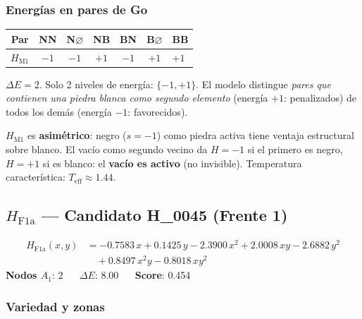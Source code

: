 \documentclass[11pt,a4paper]{article}
\newcommand{\dE}{\Delta E}
\begin{document}
\subsubsection*{Energías en pares de Go}

\begin{center}
\begin{tabular}{cccccc}
  \toprule
  Par & NN & N$\varnothing$ & NB & BN & B$\varnothing$ & BB \\
  \midrule
  $H_{\text{M1}}$ & $-1$ & $-1$ & $+1$ & $-1$ & $+1$ & $+1$ \\
  \bottomrule
\end{tabular}
\end{center}

$\dE=2$. Solo 2 niveles de energía: $\{-1, +1\}$.
El modelo distingue \emph{pares que contienen una piedra blanca como segundo elemento}
(energía $+1$: penalizados) de todos los demás (energía $-1$: favorecidos).

\begin{tcolorbox}[notebox,title={Lectura estratégica}]
$H_{\text{M1}}$ es \textbf{asimétrico}: negro ($s=-1$) como piedra activa
tiene ventaja estructural sobre blanco.
El vacío como segundo vecino da $H=-1$ si el primero es negro,
$H=+1$ si es blanco: el \textbf{vacío es activo} (no invisible).
Temperatura característica: $T_{\text{eff}}\approx 1.44$.
\end{tcolorbox}

\subsection{\texorpdfstring{$H_{\text{F1a}}$}{H\_F1a} --- Candidato H\_0045 (Frente 1)}

\begin{tcolorbox}[hambox,title={$H_{\text{F1a}}$ (H\_0045, \textcolor{cFront1}{Frente 1}) $\cdot$
  $H_1$-max = 0.1664 $\cdot$ Rob = 1.000}]
\begin{align*}
  H_{\text{F1a}}(x,y) &=
    -0.7583\,x + 0.1425\,y
    - 2.3900\,x^2 + 2.0008\,xy - 2.6882\,y^2 \\
  &\quad + 0.8497\,x^2y - 0.8018\,xy^2
\end{align*}
\textbf{Nodos $A_1$}: 2 $\quad$
\textbf{$\dE$}: 8.00 $\quad$
\textbf{Score}: 0.454
\end{tcolorbox}

\subsubsection*{Variedad y zonas}
\end{document}
